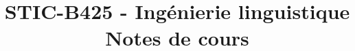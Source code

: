 
\graphicspath{{STIC-B425_Ingenierie-linguistique/images/}}

\title{STIC-B425 - Ingénierie linguistique\\Notes de cours}



\maketitle
\setcounter{tocdepth}{2}
\tableofcontents
\newpage


\newpage

\newpage

\newpage

\newpage

\newpage

\newpage

\newpage



